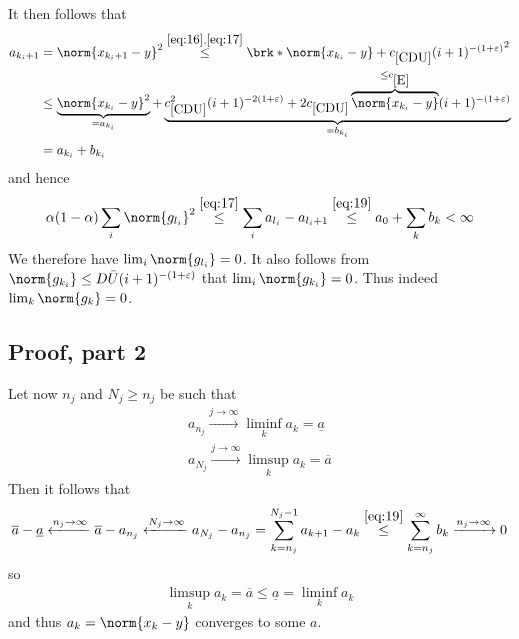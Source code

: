 \begin{frame}
	\begin{proofs}
	It then follows that
	\begin{equation}
	\begin{aligned}
		a_{{k_i}+1} &= \norm{x_{{k_i}+1}-y}^2\stackrel{\eqref{eq:16}, \eqref{eq:17}}{\leq}\brk*{\norm{x_{k_i}-y}+\useconstant{CDU}(i+1)^{-(1+\e)}}^2 \\
		&\leq \underbrace{\norm{x_{k_i}-y}^2}_{=a_{k_i}}+\underbrace{\useconstant{CDU}^2(i+1)^{-2(1+\e)}+2\useconstant{CDU}\overbrace{\norm{x_{k_i}-y}}^{\leq \useconstant{E}}(i+1)^{-(1+\e)}}_{=b_{k_i}} \\
		&= a_{k_i}+b_{k_i}
	\end{aligned}
	\label{eq:19}
	\end{equation}
	and hence
	\begin{align*}
		\alpha(1-\alpha)\sum_i\norm{g_{l_i}}^2
		\stackrel{\eqref{eq:17}}{\leq} \sum_i a_{l_i}-a_{l_i+1}
		\stackrel{\eqref{eq:19}}{\leq}a_0+\sum_k b_k
		<\infty
	\end{align*}
	We therefore have $\lim_i\norm{g_{l_i}}=0$. It also follows from $\norm{g_{k_i}}\leq D\barU (i+1)^{-(1+\e)}$ that $\lim_i\norm{g_{k_i}}=0$. Thus indeed $\lim_k\norm{g_k}=0$.
	\end{proofs}
\end{frame}

\subsection{Proof, part 2}
\begin{frame}
	\begin{proofs}
	Let now $n_j$ and  $N_j\geq n_j$ be such that
	\begin{align*}
		a_{n_j}\xrightarrow{j\to\infty}\liminf_ka_k=\underline{a} \\
		a_{N_j}\xrightarrow{j\to\infty}\limsup_ka_k=\overline{a}	
	\end{align*}
	Then it follows that
	\begin{align*}
		\overline{a}-\underline{a}
		\xleftarrow{n_j\to\infty}\overline{a}-a_{n_j}
		\xleftarrow{N_j\to\infty}a_{N_j}-a_{n_j}
		= \sum_{k=n_j}^{N_j-1}a_{k+1}-a_k
		\stackrel{\eqref{eq:19}}{\leq} \sum_{k=n_j}^\infty b_k
		\xrightarrow{n_j\to\infty}0
	\end{align*}
	so
	\begin{align*}
		\limsup_ka_k=\overline{a}\leq \underline{a}=\liminf_ka_k
	\end{align*}
	and thus $a_k=\norm{x_k-y}$ converges to some $a$.
	\end{proofs}
\end{frame}


